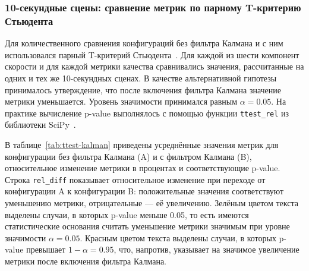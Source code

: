\subsubsection{10-секундные сцены: сравнение метрик по парному T-критерию Стьюдента}

Для количественного сравнения конфигураций без фильтра Калмана и с ним использовался парный T-критерий Стьюдента~\cite{student-t-test-habr}. Для каждой из шести компонент скорости и для каждой метрики качества сравнивались значения, рассчитанные на одних и тех же 10-секундных сценах. В качестве альтернативной гипотезы принималось утверждение, что после включения фильтра Калмана значение метрики уменьшается. Уровень значимости принимался равным \(\alpha = 0.05\). На практике вычисление p-value выполнялось с помощью функции \texttt{ttest\_rel} из библиотеки SciPy~\cite{scipy-ttest-rel}.

В таблице~\ref{tab:ttest-kalman} приведены усреднённые значения метрик для конфигурации без фильтра Калмана (A) и с фильтром Калмана (B), относительное изменение метрики в процентах и соответствующие p-value. Строка \texttt{rel\_diff} показывает относительное изменение при переходе от конфигурации A к конфигурации B: положительные значения соответствуют уменьшению метрики, отрицательные --- её увеличению. Зелёным цветом текста выделены случаи, в которых p-value меньше 0.05, то есть имеются статистические основания считать уменьшение метрики значимым при уровне значимости \(\alpha = 0.05\). Красным цветом текста выделены случаи, в которых p-value превышает \(1 - \alpha = 0.95\), что, напротив, указывает на значимое увеличение метрики после включения фильтра Калмана.

